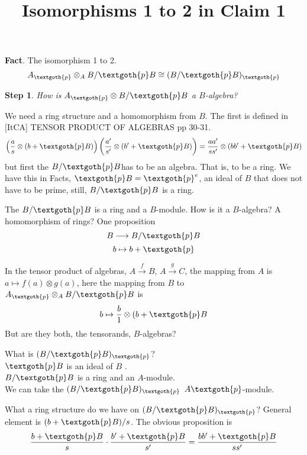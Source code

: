 \documentclass{article}
\title{Isomorphisms 1 to 2 in Claim 1}
\newtheorem{theorem}{Step}
\begin{document}
\maketitle

\textbf{Fact}. The isomorphism 1 to 2.
\[
  A_\textgoth{p} \otimes_A B/\textgoth{p}B \cong (B/\textgoth{p}B)_\textgoth{p}
\]

\begin{theorem}
How is $A_\textgoth{p} \otimes B/\textgoth{p}B$ a $B$-algebra?
\end{theorem}


We need a ring structure and a homomorphism from $B$. The first is defined in [ItCA] TENSOR PRODUCT OF ALGEBRAS pp 30-31.
\[
    \left( \frac{a}{s} \otimes (b + \textgoth{p}B) \right) \left( \frac{a'}{s'} \otimes (b' + \textgoth{p}B) \right) = \frac{aa'}{ss'} \otimes (bb' + \textgoth{p}B)
\]
but first the $B/\textgoth{p}B$has to be an algebra. That is, to be a ring. We have this in Facts, $\textgoth{p}B = \textgoth{p}^e$, an ideal of $B$ that does not have to be prime, still, $B/\textgoth{p}B$ is a ring.

The $B/\textgoth{p}B$ is a ring and a $B$-module. How is it a $B$-algebra? A homomorphism of rings? One proposition
\[
B \longrightarrow B/\textgoth{p}B
\]
\[
b \mapsto b + \textgoth{p}
\]

In the tensor product of algebras, $A \xrightarrow{f} B$, $A \xrightarrow{g} C$, the mapping from $A$ is $a \mapsto f(a) \otimes g(a)$, here the mapping from $B$ to $A_\textgoth{p} \otimes_A B/\textgoth{p}B$ is
\[
 b \mapsto \frac{b}{1} \otimes (b + \textgoth{p}B
\]
But are they both, the tensorands, $B$-algebras?

\vspace{10px}

What is $(B/\textgoth{p}B)_\textgoth{p}$? \\
$\textgoth{p}B$ is an ideal of $B$ . \\
$B/\textgoth{p}B$ is a ring and an $A$-module. \\
We can take the $(B/\textgoth{p}B)_\textgoth{p}$ $A\textgoth{p}$-module.

What a ring structure do we have on $(B/\textgoth{p}B)_\textgoth{p}$? General element is $(b + \textgoth{p}B)/s$. The obvious proposition is
\[
  \frac{b + \textgoth{p}B}{s} \cdot \frac{b' + \textgoth{p}B}{s'} = \frac{bb' + \textgoth{p}B}{ss'}
\]
\end{document}
